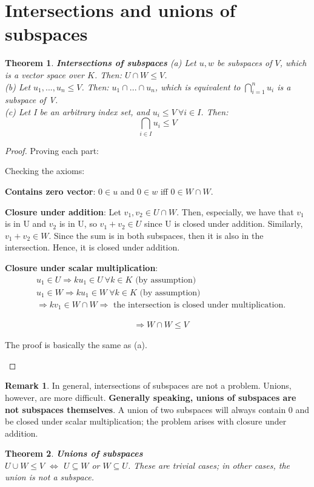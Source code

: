 \documentclass[a4paper, 12pt]{article}
\newtheorem{theorem}{Theorem}
\theoremstyle{definition}
\theoremstyle{definition}
\theoremstyle{definition}
\theoremstyle{definition}
\newtheorem{rmk}{Remark}[section]
\newenvironment{enumerate_tight}{
	\begin{enumerate}
		\setlength{\itemsep}{0pt}
		\setlength{\parskip}{0pt}
	}{\end{enumerate}}
\begin{document}
{\section{Intersections and unions of subspaces}
\begin{theorem} \textbf{Intersections of subspaces} \newline 
	(a) Let $u,w$ be subspaces of $V$, which is a vector space over $K$. Then: $U \cap W \leq V$. \\
	(b) Let $u_1, ..., u_n \leq V$. Then: $u_1 \cap ... \cap u_n$, which is equivalent to $\bigcap_{i=1}^n u_i$ is a subspace of V. \\
	(c) Let I be an arbitrary index set, and $u_i \leq V\ \forall i \in I$. Then: 
	$$
		\bigcap_{i \in I} u_i \leq V
	$$
\end{theorem}
\begin{proof} Proving each part: 
	\begin{enumerate_tight}
		\item Checking the axioms: 
		\begin{enumerate_tight}
			\item \textbf{Contains zero vector}: $0 \in u$ and $0 \in w$ iff $0 \in W \cap W$. 
			\item \textbf{Closure under addition}: Let $v_1, v_2 \in U \cap W$. Then, especially, we have that $v_1$ is in U and $v_2$ is in U, so $v_1 + v_2 \in U$ since U is closed under addition. Similarly, $v_1 + v_2 \in W$. Since the sum is in both subspaces, then it is also in the intersection. Hence, it is closed under addition. 
			\item \textbf{Closure under scalar multiplication}: 
			\begin{align*}
				& u_1 \in U \Rightarrow ku_1 \in U\ \forall k \in K \mbox{ (by assumption) } \\
				& u_1 \in W \Rightarrow ku_1 \in W\ \forall k \in K \mbox{ (by assumption) }\\
				& \Rightarrow kv_1 \in W \cap W \Rightarrow \mbox{ the intersection is closed under multiplication.} 
			\end{align*}
		\end{enumerate_tight} 
		\begin{align*}  & \Rightarrow W \cap W \leq V \end{align*} 
	\item The proof is basically the same as (a). 
	\end{enumerate_tight}	
\end{proof} 
\begin{rmk}
	In general, intersections of subspaces are not a problem. Unions, however, are more difficult. \textbf{Generally speaking, unions of subspaces are not subspaces themselves}. A union of two subspaces will always contain 0 and be closed under scalar multiplication; the problem arises with closure under addition. 
\end{rmk}
\begin{theorem}
	\textbf{Unions of subspaces} \\
	$U \cup W \leq V$ $\iff$ $U \subseteq W$ or $W \subseteq U$. These are trivial cases; in other cases, the union is not a subspace. 
\end{theorem}

}
\end{document}
